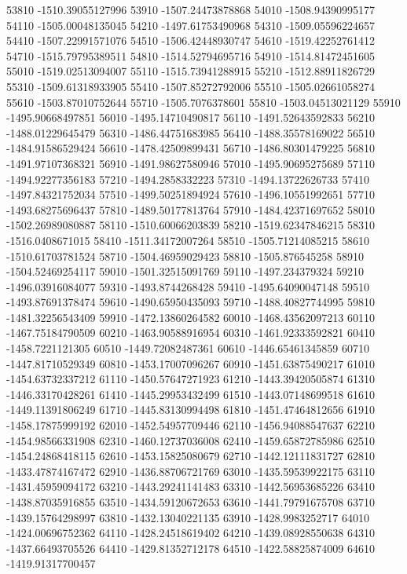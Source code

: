 {53810 -1510.39055127996
53910 -1507.24473878868
54010 -1508.94390995177
54110 -1505.00048135045
54210 -1497.61753490968
54310 -1509.05596224657
54410 -1507.22991571076
54510 -1506.42448930747
54610 -1519.42252761412
54710 -1515.79795389511
54810 -1514.52794695716
54910 -1514.81472451605
55010 -1519.02513094007
55110 -1515.73941288915
55210 -1512.88911826729
55310 -1509.61318933905
55410 -1507.85272792006
55510 -1505.02661058274
55610 -1503.87010752644
55710 -1505.7076378601
55810 -1503.04513021129
55910 -1495.90668497851
56010 -1495.14710490817
56110 -1491.52643592833
56210 -1488.01229645479
56310 -1486.44751683985
56410 -1488.35578169022
56510 -1484.91586529424
56610 -1478.42509899431
56710 -1486.80301479225
56810 -1491.97107368321
56910 -1491.98627580946
57010 -1495.90695275689
57110 -1494.92277356183
57210 -1494.2858332223
57310 -1494.13722626733
57410 -1497.84321752034
57510 -1499.50251894924
57610 -1496.10551992651
57710 -1493.68275696437
57810 -1489.50177813764
57910 -1484.42371697652
58010 -1502.26989080887
58110 -1510.60066203839
58210 -1519.62347846215
58310 -1516.0408671015
58410 -1511.34172007264
58510 -1505.71214085215
58610 -1510.61703781524
58710 -1504.46959029423
58810 -1505.876545258
58910 -1504.52469254117
59010 -1501.32515091769
59110 -1497.234379324
59210 -1496.03916084077
59310 -1493.8744268428
59410 -1495.64090047148
59510 -1493.87691378474
59610 -1490.65950435093
59710 -1488.40827744995
59810 -1481.32256543409
59910 -1472.13860264582
60010 -1468.43562097213
60110 -1467.75184790509
60210 -1463.90588916954
60310 -1461.92333592821
60410 -1458.7221121305
60510 -1449.72082487361
60610 -1446.65461345859
60710 -1447.81710529349
60810 -1453.17007096267
60910 -1451.63875490217
61010 -1454.63732337212
61110 -1450.57647271923
61210 -1443.39420505874
61310 -1446.33170428261
61410 -1445.29953432499
61510 -1443.07148699518
61610 -1449.11391806249
61710 -1445.83130994498
61810 -1451.47464812656
61910 -1458.17875999192
62010 -1452.54957709446
62110 -1456.94088547637
62210 -1454.98566331908
62310 -1460.12737036008
62410 -1459.65872785986
62510 -1454.24868418115
62610 -1453.15825080679
62710 -1442.12111831727
62810 -1433.47874167472
62910 -1436.88706721769
63010 -1435.59539922175
63110 -1431.45959094172
63210 -1443.29241141483
63310 -1442.56953685226
63410 -1438.87035916855
63510 -1434.59120672653
63610 -1441.79791675708
63710 -1439.15764298997
63810 -1432.13040221135
63910 -1428.9983252717
64010 -1424.00696752362
64110 -1428.24518619402
64210 -1439.08928550638
64310 -1437.66493705526
64410 -1429.81352712178
64510 -1422.58825874009
64610 -1419.91317700457
}
